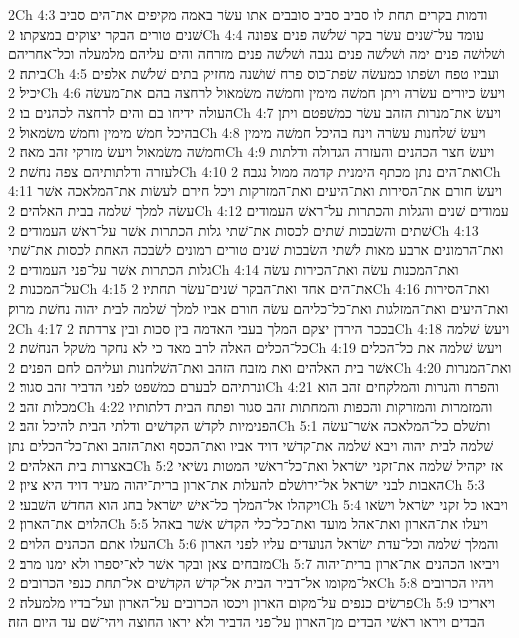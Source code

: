 2Ch 4:3  ודמות בקרים תחת לו סביב סביב סובבים אתו עשׂר באמה מקיפים את־הים סביב שׁנים טורים הבקר יצוקים במצקתו׃
2Ch 4:4  עומד על־שׁנים עשׂר בקר שׁלשׁה פנים צפונה ושׁלושׁה פנים ימה ושׁלשׁה פנים נגבה ושׁלשׁה פנים מזרחה והים עליהם מלמעלה וכל־אחריהם ביתה׃
2Ch 4:5  ועביו טפח ושׂפתו כמעשׂה שׂפת־כוס פרח שׁושׁנה מחזיק בתים שׁלשׁת אלפים יכיל׃
2Ch 4:6  ויעשׂ כיורים עשׂרה ויתן חמשׁה מימין וחמשׁה משׂמאול לרחצה בהם את־מעשׂה העולה ידיחו בם והים לרחצה לכהנים בו׃
2Ch 4:7  ויעשׂ את־מנרות הזהב עשׂר כמשׁפטם ויתן בהיכל חמשׁ מימין וחמשׁ משׂמאול׃
2Ch 4:8  ויעשׂ שׁלחנות עשׂרה וינח בהיכל חמשׁה מימין וחמשׁה משׂמאול ויעשׂ מזרקי זהב מאה׃
2Ch 4:9  ויעשׂ חצר הכהנים והעזרה הגדולה ודלתות לעזרה ודלתותיהם צפה נחשׁת׃
2Ch 4:10  ואת־הים נתן מכתף הימנית קדמה ממול נגבה׃
2Ch 4:11  ויעשׂ חורם את־הסירות ואת־היעים ואת־המזרקות ויכל חירם לעשׂות את־המלאכה אשׁר עשׂה למלך שׁלמה בבית האלהים׃
2Ch 4:12  עמודים שׁנים והגלות והכתרות על־ראשׁ העמודים שׁתים והשׂבכות שׁתים לכסות את־שׁתי גלות הכתרות אשׁר על־ראשׁ העמודים׃
2Ch 4:13  ואת־הרמונים ארבע מאות לשׁתי השׂבכות שׁנים טורים רמונים לשׂבכה האחת לכסות את־שׁתי גלות הכתרות אשׁר על־פני העמודים׃
2Ch 4:14  ואת־המכנות עשׂה ואת־הכירות עשׂה על־המכנות׃
2Ch 4:15  את־הים אחד ואת־הבקר שׁנים־עשׂר תחתיו׃
2Ch 4:16  ואת־הסירות ואת־היעים ואת־המזלגות ואת־כל־כליהם עשׂה חורם אביו למלך שׁלמה לבית יהוה נחשׁת מרוק׃
2Ch 4:17  בככר הירדן יצקם המלך בעבי האדמה בין סכות ובין צרדתה׃
2Ch 4:18  ויעשׂ שׁלמה כל־הכלים האלה לרב מאד כי לא נחקר משׁקל הנחשׁת׃
2Ch 4:19  ויעשׂ שׁלמה את כל־הכלים אשׁר בית האלהים ואת מזבח הזהב ואת־השׁלחנות ועליהם לחם הפנים׃
2Ch 4:20  ואת־המנרות ונרתיהם לבערם כמשׁפט לפני הדביר זהב סגור׃
2Ch 4:21  והפרח והנרות והמלקחים זהב הוא מכלות זהב׃
2Ch 4:22  והמזמרות והמזרקות והכפות והמחתות זהב סגור ופתח הבית דלתותיו הפנימיות לקדשׁ הקדשׁים ודלתי הבית להיכל זהב׃
2Ch 5:1  ותשׁלם כל־המלאכה אשׁר־עשׂה שׁלמה לבית יהוה ויבא שׁלמה את־קדשׁי דויד אביו ואת־הכסף ואת־הזהב ואת־כל־הכלים נתן באצרות בית האלהים׃
2Ch 5:2  אז יקהיל שׁלמה את־זקני ישׂראל ואת־כל־ראשׁי המטות נשׂיאי האבות לבני ישׂראל אל־ירושׁלם להעלות את־ארון ברית־יהוה מעיר דויד היא ציון׃
2Ch 5:3  ויקהלו אל־המלך כל־אישׁ ישׂראל בחג הוא החדשׁ השׁבעי׃
2Ch 5:4  ויבאו כל זקני ישׂראל וישׂאו הלוים את־הארון׃
2Ch 5:5  ויעלו את־הארון ואת־אהל מועד ואת־כל־כלי הקדשׁ אשׁר באהל העלו אתם הכהנים הלוים׃
2Ch 5:6  והמלך שׁלמה וכל־עדת ישׂראל הנועדים עליו לפני הארון מזבחים צאן ובקר אשׁר לא־יספרו ולא ימנו מרב׃
2Ch 5:7  ויביאו הכהנים את־ארון ברית־יהוה אל־מקומו אל־דביר הבית אל־קדשׁ הקדשׁים אל־תחת כנפי הכרובים׃
2Ch 5:8  ויהיו הכרובים פרשׂים כנפים על־מקום הארון ויכסו הכרובים על־הארון ועל־בדיו מלמעלה׃
2Ch 5:9  ויאריכו הבדים ויראו ראשׁי הבדים מן־הארון על־פני הדביר ולא יראו החוצה ויהי־שׁם עד היום הזה׃

